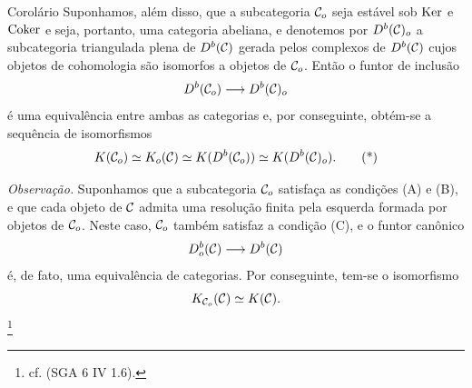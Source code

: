 \begin{statement}{Corolário}
Suponhamos, além disso, que a subcategoria $\mathcal C_o$ seja estável sob $\operatorname{Ker}$ e $\operatorname{Coker}$ e seja, portanto, uma categoria abeliana, e denotemos por $D^b(\mathcal C)_o$ a subcategoria triangulada plena de $D^b(\mathcal C)$ gerada pelos complexos de $D^b(\mathcal C)$ cujos objetos de cohomologia são isomorfos a objetos de $\mathcal C_o$. Então o funtor de inclusão
\[
D^b(\mathcal C_o)\longrightarrow D^b(\mathcal C)_o
\]
é uma equivalência entre ambas as categorias e, por conseguinte, obtém-se a sequência de isomorfismos
\[
K(\mathcal C_o)\simeq K_o(\mathcal C)\simeq K(D^b(\mathcal C_o))\simeq K(D^b(\mathcal C)_o).
\tag{*}
\]
\end{statement}

\emph{Observação.} Suponhamos que a subcategoria $\mathcal C_o$ satisfaça as condições (A) e (B), e que cada objeto de $\mathcal C$ admita uma resolução finita pela esquerda formada por objetos de $\mathcal C_o$. Neste caso, $\mathcal C_o$ também satisfaz a condição (C), e o funtor canônico
\[
D_o^b(\mathcal C)\longrightarrow D^b(\mathcal C)
\]
é, de fato, uma equivalência de categorias. Por conseguinte, tem-se o isomorfismo
\[
K_{\mathcal C_o}(\mathcal C)\simeq K(\mathcal C).
\]
\footnote{cf. (SGA 6 IV 1.6).}
